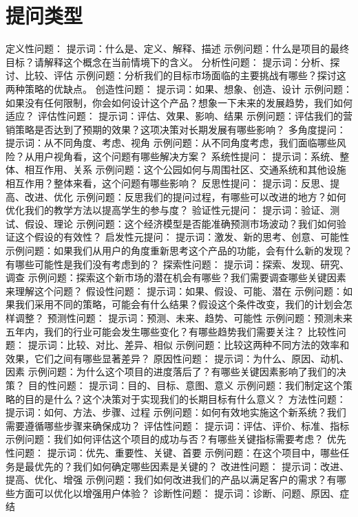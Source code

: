 \documentclass[12pt]{book}
\begin{document}
\section{提问类型}
定义性问题：
提示词：什么是、定义、解释、描述
示例问题：什么是项目的最终目标？请解释这个概念在当前情境下的含义。
分析性问题：
提示词：分析、探讨、比较、评估
示例问题：分析我们的目标市场面临的主要挑战有哪些？探讨这两种策略的优缺点。
创造性问题：
提示词：如果、想象、创造、设计
示例问题：如果没有任何限制，你会如何设计这个产品？想象一下未来的发展趋势，我们如何适应？
评估性问题：
提示词：评估、效果、影响、结果
示例问题：评估我们的营销策略是否达到了预期的效果？这项决策对长期发展有哪些影响？
多角度提问：
提示词：从不同角度、考虑、视角
示例问题：从不同角度考虑，我们面临哪些风险？从用户视角看，这个问题有哪些解决方案？
系统性提问：
提示词：系统、整体、相互作用、关系
示例问题：这个公园如何与周围社区、交通系统和其他设施相互作用？整体来看，这个问题有哪些影响？
反思性提问：
提示词：反思、提高、改进、优化
示例问题：反思我们的提问过程，有哪些可以改进的地方？如何优化我们的教学方法以提高学生的参与度？
验证性元提问：
提示词：验证、测试、假设、理论
示例问题：这个经济模型是否能准确预测市场波动？我们如何验证这个假设的有效性？
启发性元提问：
提示词：激发、新的思考、创意、可能性
示例问题：如果我们从用户的角度重新思考这个产品的功能，会有什么新的发现？有哪些可能性是我们没有考虑到的？
探索性问题：
提示词：探索、发现、研究、调查
示例问题：探索这个新市场的潜在机会有哪些？我们需要调查哪些关键因素来理解这个问题？
假设性问题：
提示词：如果、假设、可能、潜在
示例问题：如果我们采用不同的策略，可能会有什么结果？假设这个条件改变，我们的计划会怎样调整？
预测性问题：
提示词：预测、未来、趋势、可能性
示例问题：预测未来五年内，我们的行业可能会发生哪些变化？有哪些趋势我们需要关注？
比较性问题：
提示词：比较、对比、差异、相似
示例问题：比较这两种不同方法的效率和效果，它们之间有哪些显著差异？
原因性问题：
提示词：为什么、原因、动机、因素
示例问题：为什么这个项目的进度落后了？有哪些关键因素影响了我们的决策？
目的性问题：
提示词：目的、目标、意图、意义
示例问题：我们制定这个策略的目的是什么？这个决策对于实现我们的长期目标有什么意义？
方法性问题：
提示词：如何、方法、步骤、过程
示例问题：如何有效地实施这个新系统？我们需要遵循哪些步骤来确保成功？
评估性问题：
提示词：评估、评价、标准、指标
示例问题：我们如何评估这个项目的成功与否？有哪些关键指标需要考虑？
优先性问题：
提示词：优先、重要性、关键、首要
示例问题：在这个项目中，哪些任务是最优先的？我们如何确定哪些因素是关键的？
改进性问题：
提示词：改进、提高、优化、增强
示例问题：我们如何改进我们的产品以满足客户的需求？有哪些方面可以优化以增强用户体验？
诊断性问题：
提示词：诊断、问题、原因、症结
\end{document}

